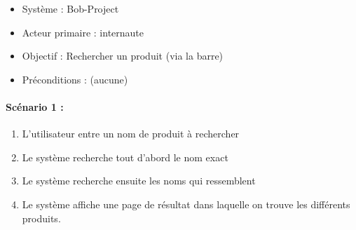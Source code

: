 %
%
\begin{boxedminipage}[t]{12cm}
	\begin{itemize}
		\item Système : Bob-Project
		\item Acteur primaire : internaute
		\item Objectif : Rechercher un produit (via la barre)
		\item Préconditions : (aucune)
	\end{itemize}

	\renewcommand\theenumi{\arabic{enumi}}
	\renewcommand\labelenumi{\theenumi .}
	\renewcommand\theenumii{\Alph{enumii}}
	\renewcommand\labelenumii{(\theenumii)}
	\paragraph*{Scénario 1 :}
	\begin{enumerate}
		\item \label{sr1l1} L'utilisateur entre un nom de produit à rechercher
		\item \label{sr1l2} Le système recherche tout d'abord le nom exact
		\item \label{sr1l3} Le système recherche ensuite les noms qui ressemblent
		\item \label{sr1l4} Le système affiche une page de résultat dans laquelle on trouve les différents produits.
	\end{enumerate}


	\renewcommand\theenumi{\Alph{enumi}}
	\renewcommand\labelenumi{\theenumi )}
	\renewcommand\theenumii{\arabic{enumii}}
	\renewcommand\labelenumii{\theenumii .}

\end{boxedminipage}
